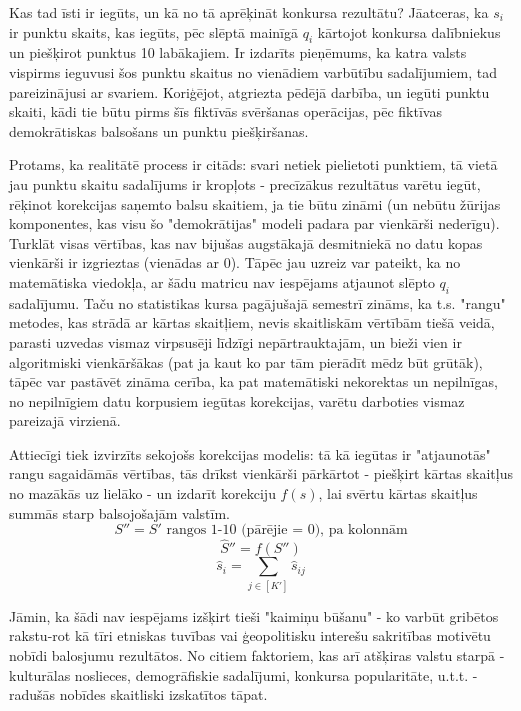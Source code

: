 \documentclass[12pt, a4paper]{article}
\begin{document}
Kas tad īsti ir iegūts, un kā no tā aprēķināt konkursa rezultātu? Jāatceras, ka $s_i$ ir punktu skaits, kas iegūts, pēc slēptā mainīgā $q_i$ kārtojot konkursa dalībniekus un piešķirot punktus 10 labākajiem. Ir izdarīts pieņēmums, ka katra valsts vispirms ieguvusi šos punktu skaitus no vienādiem varbūtību sadalījumiem, tad pareizinājusi ar svariem. Koriģējot, atgriezta pēdējā darbība, un iegūti punktu skaiti, kādi tie būtu pirms šīs fiktīvās svēršanas operācijas, pēc fiktīvas demokrātiskas balsošans un punktu piešķiršanas. 

Protams, ka realitātē process ir citāds: svari netiek pielietoti punktiem, tā vietā jau punktu skaitu sadalījums ir kropļots - precīzākus rezultātus varētu iegūt, rēķinot korekcijas saņemto balsu skaitiem, ja tie būtu zināmi (un nebūtu žūrijas komponentes, kas visu šo "demokrātijas" modeli padara par vienkārši nederīgu). Turklāt visas vērtības, kas nav bijušas augstākajā desmitniekā no datu kopas vienkārši ir izgrieztas (vienādas ar 0). Tāpēc jau uzreiz var pateikt, ka no matemātiska viedokļa, ar šādu matricu nav iespējams atjaunot slēpto $q_i$ sadalījumu. Taču no statistikas kursa pagājušajā semestrī zināms, ka t.s. "rangu" metodes, kas strādā ar kārtas skaitļiem, nevis skaitliskām vērtībām tiešā veidā, parasti uzvedas vismaz virpsusēji līdzīgi nepārtrauktajām, un bieži vien ir algoritmiski vienkāršākas (pat ja kaut ko par tām pierādīt mēdz būt grūtāk), tāpēc var pastāvēt zināma cerība, ka pat matemātiski nekorektas un nepilnīgas, no nepilnīgiem datu korpusiem iegūtas korekcijas, varētu darboties vismaz pareizajā virzienā.

Attiecīgi tiek izvirzīts sekojošs korekcijas modelis: tā kā iegūtas ir "atjaunotās" rangu sagaidāmās vērtības, tās drīkst vienkārši pārkārtot - piešķirt kārtas skaitļus no mazākās uz lielāko - un izdarīt korekciju $f(s)$, lai svērtu kārtas skaitļus summās starp balsojošajām valstīm.
\begin{equation}
    S'' = S' \text{ rangos 1-10 (pārējie = 0), pa kolonnām}
\end{equation}
\begin{equation}
    \hat S'' = f(S'')
\end{equation}
\begin{equation}
    \hat s_i = \sum_{j \in [K']}\hat s_{ij}
\end{equation}


Jāmin, ka šādi nav iespējams izšķirt tieši "kaimiņu būšanu" - ko varbūt gribētos rakstu-rot kā tīri etniskas tuvības vai ģeopolitisku interešu sakritības motivētu nobīdi balosjumu rezultātos. No citiem faktoriem, kas arī atšķiras valstu starpā - kulturālas noslieces, demogrāfiskie sadalījumi, konkursa popularitāte, u.t.t. - radušās nobīdes skaitliski izskatītos tāpat. 
\end{document}
